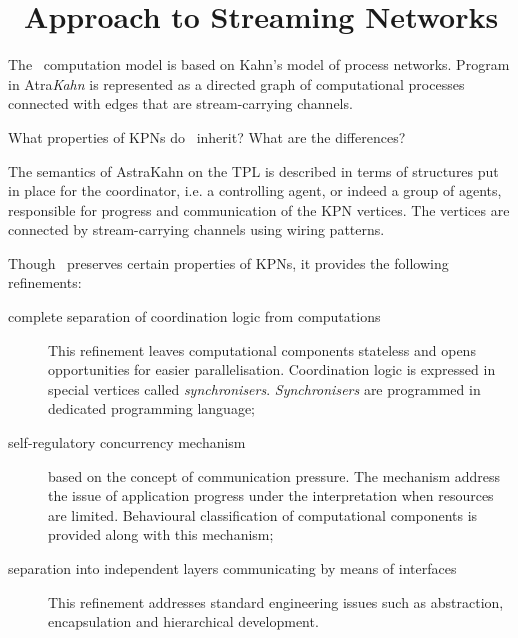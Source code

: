     \section{\ak\ Approach to Streaming Networks}
The \ak\ computation model is based on Kahn's model of process networks. Program in Atra\emph{Kahn} is represented as a directed graph of computational processes connected with edges that are stream-carrying channels.

What properties of KPNs do \ak\ inherit? What are the differences?


The semantics of AstraKahn on the TPL is described in terms of structures put in place for the coordinator, i.e. a controlling agent, or indeed a group of agents, responsible for progress and communication of the KPN vertices. The vertices are connected by stream-carrying channels using wiring patterns.


Though \ak\ preserves certain properties of KPNs, it provides the following refinements:
\begin{description}
\item[complete separation of coordination logic from computations]

This refinement leaves computational components stateless and opens opportunities for easier parallelisation. Coordination logic is expressed in special vertices called \emph{synchronisers}. \emph{Synchronisers} are programmed in dedicated programming language;
\item[self-regulatory concurrency mechanism] based on the concept of communication pressure. The mechanism address the issue of application progress under the interpretation when resources are limited. Behavioural classification of computational components is provided along with this mechanism;
\item[separation into independent layers communicating by means of interfaces]

This refinement addresses standard engineering issues such as abstraction, encapsulation and hierarchical development.
\end{description}


